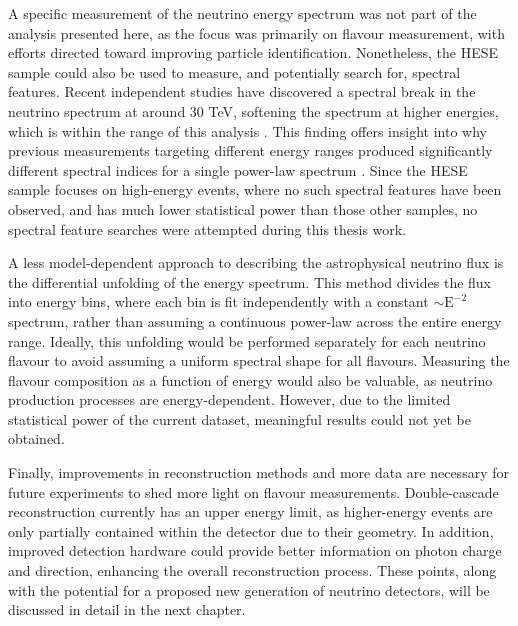 A specific measurement of the neutrino energy spectrum was not part of the analysis presented here, as the focus was primarily on flavour measurement, with efforts directed toward improving particle identification. Nonetheless, the HESE sample could also be used to measure, and potentially search for, spectral features. Recent independent studies have discovered a spectral break in the neutrino spectrum at around 30 TeV, softening the spectrum at higher energies, which is within the range of this analysis . This finding offers insight into why previous measurements targeting different energy ranges produced significantly different spectral indices for a single power-law spectrum . Since the HESE sample focuses on high-energy events, where no such spectral features have been observed, and has much lower statistical power than those other samples, no spectral feature searches were attempted during this thesis work.

A less model-dependent approach to describing the astrophysical neutrino flux is the differential unfolding of the energy spectrum. This method divides the flux into energy bins, where each bin is fit independently with a constant $\sim\mathrm{E}^{-2}$ spectrum, rather than assuming a continuous power-law across the entire energy range. Ideally, this unfolding would be performed separately for each neutrino flavour to avoid assuming a uniform spectral shape for all flavours. Measuring the flavour composition as a function of energy would also be valuable, as neutrino production processes are energy-dependent. However, due to the limited statistical power of the current dataset, meaningful results could not yet be obtained.

Finally, improvements in reconstruction methods and more data are necessary for future experiments to shed more light on flavour measurements. Double-cascade reconstruction currently has an upper energy limit, as higher-energy events are only partially contained within the detector due to their geometry. In addition, improved detection hardware could provide better information on photon charge and direction, enhancing the overall reconstruction process. These points, along with the potential for a proposed new generation of neutrino detectors, will be discussed in detail in the next chapter. 


